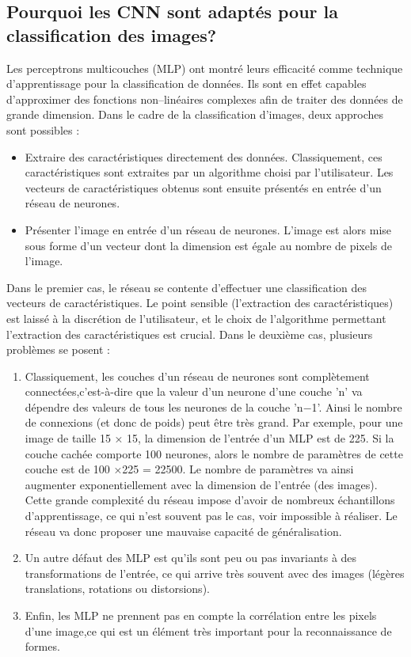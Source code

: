\subsection{Pourquoi les CNN sont adaptés pour la classification des images?}
Les perceptrons multicouches (MLP) ont montré leurs efficacité comme technique d’apprentissage pour la classification de données. Ils sont en effet capables d’approximer des fonctions non–linéaires complexes afin de traiter des données de grande dimension. Dans le cadre de la classification d’images, deux approches sont possibles \cite{55}:
\begin{itemize}
    \item Extraire des caractéristiques directement des données. Classiquement, ces caractéristiques sont extraites par un algorithme choisi par l’utilisateur. Les vecteurs de caractéristiques obtenus sont ensuite présentés en entrée d’un réseau de neurones.
     \item Présenter l’image en entrée d’un réseau de neurones. L’image est alors mise sous forme d’un vecteur dont la dimension est égale au nombre de pixels de l’image.
\end{itemize}
Dans le premier cas, le réseau se contente d’effectuer une classification des vecteurs de
caractéristiques. Le point sensible (l’extraction des caractéristiques) est laissé à la discrétion de
l’utilisateur, et le choix de l’algorithme permettant l’extraction des caractéristiques est crucial.
Dans le deuxième cas, plusieurs problèmes se posent \cite{55}:
\begin{enumerate}
    \item Classiquement, les couches d’un réseau de neurones sont complètement connectées,c’est-à-dire que la valeur d’un neurone d’une couche 'n' va dépendre des valeurs de tous les neurones de la couche 'n−1'. Ainsi le nombre de connexions (et donc de poids) peut être très grand. Par exemple, pour une image de taille 15 × 15, la dimension de l’entrée d’un MLP est de 225. Si la couche cachée
comporte 100 neurones, alors le nombre de paramètres de cette couche est de 100 ×225 = 22500. Le nombre de paramètres va ainsi augmenter exponentiellement avec la
dimension de l’entrée (des images). Cette grande complexité du réseau impose d’avoir de nombreux échantillons d’apprentissage, ce qui n’est souvent pas le cas, voir impossible à réaliser. Le réseau va donc proposer une mauvaise capacité de généralisation.
    \item Un autre défaut des MLP est qu’ils sont peu ou pas invariants à des transformations de
l’entrée, ce qui arrive très souvent avec des images (légères translations, rotations ou distorsions).
    \item Enfin, les MLP ne prennent pas en compte la corrélation entre les pixels d’une image,ce qui est un élément très important pour la reconnaissance de formes.
 \end{enumerate}   
